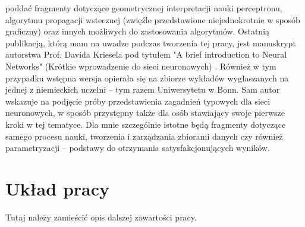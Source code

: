 poddać fragmenty dotyczące geometrycznej interpretacji nauki perceptronu, algorytmu propagacji wstecznej (zwięźle przedstawione niejednokrotnie w sposób graficzny) oraz innych możliwych do zastosowania algorytmów. Ostatnią publikacją, którą mam na uwadze podczas tworzenia tej pracy, jest manuskrypt autorstwa Prof. Davida Kriesela pod tytułem "A brief introduction to Neural Networks" (Krótkie wprowadzenie do sieci neuronowych) \cite{Kri07}. Również w tym przypadku wstępna wersja opierała się na zbiorze wykładów wygłaszanych na jednej z niemieckich uczelni -- tym razem Uniwersytetu w Bonn. Sam autor wskazuje na podjęcie próby przedstawienia zagadnień typowych dla sieci neuronowych, w sposób przystępny także dla osób stawiający swoje pierwsze kroki w tej tematyce. Dla mnie szczególnie istotne będą fragmenty dotyczące samego procesu nauki, tworzenia i zarządzania zbiorami danych czy również parametryzacji -- podstawy do otrzymania satysfakcjonujących wyników.

\section{Układ pracy}
\iffalse
{\color{red} Tutaj należy zamieścić opis dalszej zawartości pracy.}

